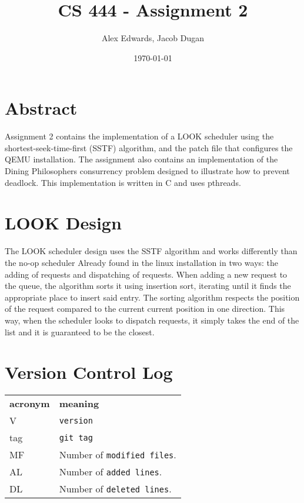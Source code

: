 \documentclass[letterpaper,10pt]{article}
\title{CS 444 - Assignment 2}
\author{Alex Edwards, Jacob Dugan}
\date{\today}
\begin{document}
	\maketitle
	\section*{Abstract}
	Assignment 2 contains the implementation of a LOOK scheduler using the shortest-seek-time-first (SSTF) algorithm, and the patch file that configures the QEMU installation. The assignment also contains an implementation of the Dining Philosophers consurrency problem designed to illustrate how to prevent deadlock. This implementation is written in C and uses pthreads.
	
	\section{LOOK Design}
	The LOOK scheduler design uses the SSTF algorithm and works differently than the no-op scheduler Already found in the linux installation in two ways: the adding of requests and dispatching of requests. When adding a new request to the queue, the algorithm sorts it using insertion sort, iterating until it finds the appropriate place to insert said entry. The sorting algorithm respects the position of the request compared to the current current position in one direction. This way, when the scheduler looks to dispatch requests, it simply takes the end of the list and it is guaranteed to be the closest.
	
	\section{Version Control Log}

	\begin{tabular}{lp{12cm}}
		\label{tabular:legend:git-log}
		\textbf{acronym} & \textbf{meaning} \\
		V & \texttt{version} \\
		tag & \texttt{git tag} \\
		MF & Number of \texttt{modified files}. \\
		AL & Number of \texttt{added lines}. \\
		DL & Number of \texttt{deleted lines}. \\
	\end{tabular}
		
	\bigskip
	
\end{document}
